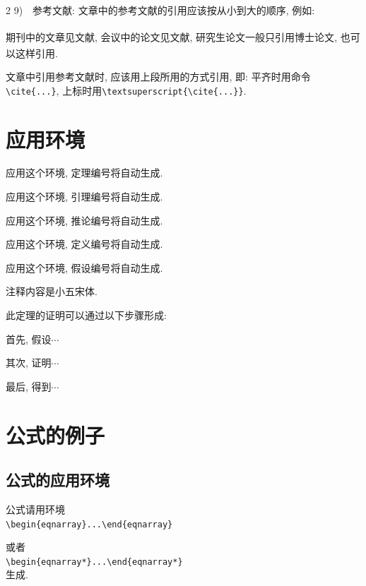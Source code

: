 \begin{multicols}{2}
9)~~参考文献: 文章中的参考文献的引用应该按从小到大的顺序, 例如:

期刊中的文章见文献\!\cite{1,2}, 会议中的论文见文献\!\cite{3},
研究生论文一般只引用博士论文\!\textsuperscript{\cite{4}},
也可以这样引用\!\textsuperscript{\cite{1,4,5,6}}.

文章中引用参考文献时, 应该用上段所用的方式引用, 即:
平齐时用命令\verb|\cite{...}|,
上标时用\verb|\textsuperscript{\cite{...}}|.
\section{应用环境}
\begin{Thm}
应用这个环境, 定理编号将自动生成.
\end{Thm}
\begin{Site}
应用这个环境, 引理编号将自动生成.
\end{Site}
\begin{Cor}
应用这个环境, 推论编号将自动生成.
\end{Cor}
\begin{Def}
应用这个环境, 定义编号将自动生成.
\end{Def}
\begin{Sup}
应用这个环境, 假设编号将自动生成.
\end{Sup}
\begin{Rem}{\fontsize{9.3pt}{11.6pt}\selectfont 注释内容是小五宋体.}\end{Rem}
此定理的证明可以通过以下步骤形成:
\begin{Ste}首先, 假设$\cdots$\end{Ste}
\begin{Ste}其次, 证明$\cdots$\end{Ste}
\begin{Ste}最后, 得到$\cdots$\end{Ste}
\section{公式的例子}
\subsection{公式的应用环境}
公式请用环境\\
 \verb|\begin{eqnarray}...\end{eqnarray}|

 或者\\
\verb|\begin{eqnarray*}...\end{eqnarray*}|\\
生成.

\end{multicols}
